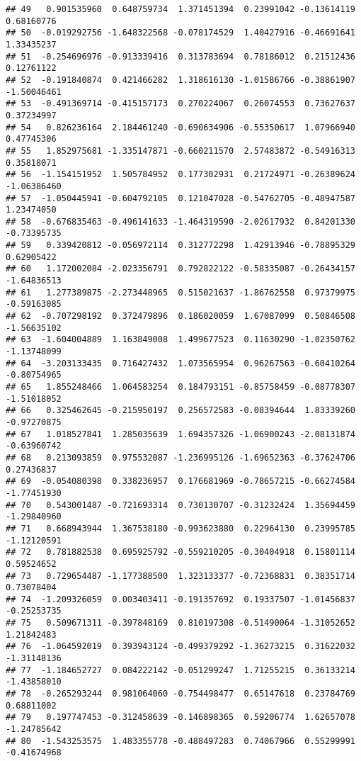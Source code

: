 \documentclass[
]{article}
\begin{document}
\begin{verbatim}
## 49   0.901535960  0.648759734  1.371451394  0.23991042 -0.13614119  0.68160776
## 50  -0.019292756 -1.648322568 -0.078174529  1.40427916 -0.46691641  1.33435237
## 51  -0.254696976 -0.913339416  0.313783694  0.78186012  0.21512436  0.12761122
## 52  -0.191840874  0.421466282  1.318616130 -1.01586766 -0.38861907 -1.50046461
## 53  -0.491369714 -0.415157173  0.270224067  0.26074553  0.73627637  0.37234997
## 54   0.826236164  2.184461240 -0.690634906 -0.55350617  1.07966940  0.47745306
## 55   1.852975681 -1.335147871 -0.660211570  2.57483872 -0.54916313  0.35818071
## 56  -1.154151952  1.505784952  0.177302931  0.21724971 -0.26389624 -1.06386460
## 57  -1.050445941 -0.604792105  0.121047028 -0.54762705 -0.48947587  1.23474050
## 58  -0.676835463 -0.496141633 -1.464319590 -2.02617932  0.84201330 -0.73395735
## 59   0.339420812 -0.056972114  0.312772298  1.42913946 -0.78895329  0.62905422
## 60   1.172002084 -2.023356791  0.792822122 -0.58335087 -0.26434157 -1.64836513
## 61   1.277389875 -2.273448965  0.515021637 -1.86762558  0.97379975 -0.59163085
## 62  -0.707298192  0.372479896  0.186020059  1.67087099  0.50846508 -1.56635102
## 63  -1.604004889  1.163849008  1.499677523  0.11630290 -1.02350762 -1.13748099
## 64  -3.203133435  0.716427432  1.073565954  0.96267563 -0.60410264 -0.80754965
## 65   1.855248466  1.064583254  0.184793151 -0.85758459 -0.08778307 -1.51018052
## 66   0.325462645 -0.215950197  0.256572583 -0.08394644  1.83339260 -0.97270875
## 67   1.018527841  1.285035639  1.694357326 -1.06900243 -2.08131874 -0.63960742
## 68   0.213093859  0.975532087 -1.236995126 -1.69652363 -0.37624706  0.27436837
## 69  -0.054080398  0.338236957  0.176681969 -0.78657215 -0.66274584 -1.77451930
## 70   0.543001487 -0.721693314  0.730130707 -0.31232424  1.35694459 -1.29840960
## 71   0.668943944  1.367538180 -0.993623880  0.22964130  0.23995785 -1.12120591
## 72   0.781882538  0.695925792 -0.559210205 -0.30404918  0.15801114  0.59524652
## 73   0.729654487 -1.177388500  1.323133377 -0.72368831  0.38351714  0.73078404
## 74  -1.209326059  0.003403411 -0.191357692  0.19337507 -1.01456837 -0.25253735
## 75   0.509671311 -0.397848169  0.810197308 -0.51490064 -1.31052652  1.21842483
## 76  -1.064592019  0.393943124 -0.499379292 -1.36273215  0.31622032 -1.31148136
## 77  -1.184652727  0.084222142 -0.051299247  1.71255215  0.36133214 -1.43858010
## 78  -0.265293244  0.981064060 -0.754498477  0.65147618  0.23784769  0.68811002
## 79   0.197747453 -0.312458639 -0.146898365  0.59206774  1.62657078 -1.24785642
## 80  -1.543253575  1.483355778 -0.488497283  0.74067966  0.55299991 -0.41674968

\end{verbatim}
\end{document}
